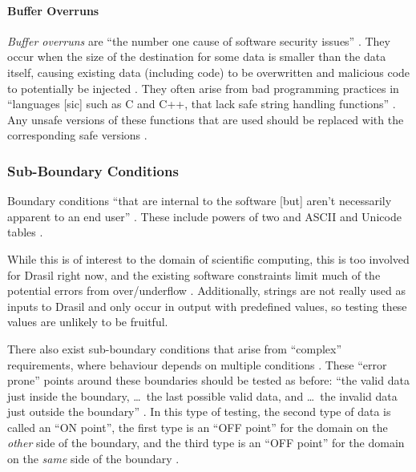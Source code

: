\paragraph{Buffer Overruns \citep[pp.~201-205]{Patton2006}}

\emph{Buffer overruns} are ``the number one cause of software security issues''
\citep[p.~75]{Patton2006}. They occur when the size of the destination
for some data is smaller than the data itself, causing existing data (including
code) to be overwritten and malicious code to potentially be injected
\citep[p.~202,~204-205]{Patton2006}. They often arise from bad
programming practices in ``languages [sic] such as C and C++, that lack safe
string handling functions'' \citep[p.~201]{Patton2006}. Any unsafe
versions of these functions that are used should be replaced with the
corresponding safe versions \citep[pp.~203-204]{Patton2006}.

\subsubsection[Sub-Boundary Conditions]{Sub-Boundary Conditions
      \citep[pp.~75-77]{Patton2006}}
\label{sub-bound-conds}

Boundary conditions ``that are internal to the software [but] aren't necessarily
apparent to an end user'' \citep[p.~75]{Patton2006}. These include
powers of two \citep[pp.~75-76]{Patton2006} and ASCII and Unicode tables
\citep[pp.~76-77]{Patton2006}.

While this is of interest to the domain of scientific computing, this is too
involved for Drasil right now, and the existing software constraints limit much
of the potential errors from over/underflow \citep{june_11_meeting}. Additionally,
strings are not really used as inputs to Drasil and only occur in output with
predefined values, so testing these values are unlikely to be fruitful.

There also exist sub-boundary conditions that arise from ``complex''
requirements, where behaviour depends on multiple conditions
\citep[p.~430]{vanVliet2000}. These ``error prone'' points around
these boundaries should be tested \citep[p.~430]{vanVliet2000} as
before: ``the valid data just inside the boundary, \dots\ the last possible
valid data, and \dots\ the invalid data just outside the boundary''
\citep[p.~73]{Patton2006}. In this type of testing, the second type of
data is called an ``ON point'', the first type is an ``OFF point'' for the
domain on the \emph{other} side of the boundary, and the third type is an ``OFF
point'' for the domain on the \emph{same} side of the boundary
\citep[p.~430]{vanVliet2000}.

